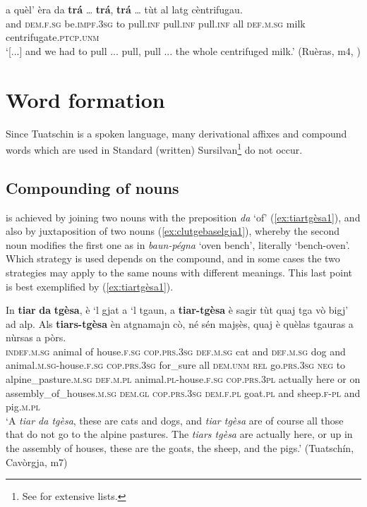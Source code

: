 \ea
\label{ex:rep2}
\gll [...] a quèl’ èra da \textbf{trá} … \textbf{trá}, \textbf{trá} … tùt al latg cèntrifugau.\\
{} and \textsc{dem.f.sg} be.\textsc{impf.3sg} to pull.\textsc{inf} {} pull.\textsc{inf} pull.\textsc{inf} {} all \textsc{def.m.sg} milk centrifugate.\textsc{ptcp.unm}    \\
\glt `[...] and we had to pull ... pull, pull ... the whole centrifuged milk.' (Ruèras, m4, )
\z

\section{Word formation}\label{sec:7.2}
Since Tuatschin is a spoken language, many derivational affixes and compound words which are used in Standard (written) Sursilvan\footnote{See \citet[163--194]{Spescha1989} for extensive lists.} do not occur.

\subsection{Compounding of nouns}\label{7.2.1}
 is achieved by joining two nouns with the preposition \textit{da} `of' (\ref{ex:tiartgèsa1}), and also by juxtaposition of two nouns (\ref{ex:clutgebaselgja1}), whereby the second noun modifies the first one as in \textit{baun-pégna} `oven bench', literally `bench-oven'. Which strategy is used depends on the compound, and in some cases the two strategies may apply to the same nouns with different meanings. This last point is best exemplified by (\ref{ex:tiartgèsa1}).

\ea\label{ex:tiartgèsa1}
\gll  In \textbf{tiar} \textbf{da} \textbf{tgèsa}, è `l gjat a `l tgaun, a \textbf{tiar-tgèsa} è sagir tùt quaj tga vò bigj’ ad alp. Als \textbf{tiars-tgèsa} èn atgnamajn cò, né sén majṣès, quaj è quèlas tgauras a nùrsas a pòrs.  \\
\textsc{indef.m.sg} animal of house.\textsc{f.sg} \textsc{cop.prs.3sg} \textsc{def.m.sg} cat and \textsc{def.m.sg} dog  and animal.\textsc{m.sg}-house.\textsc{f.sg} \textsc{cop.prs.3sg} for\_sure all \textsc{dem.unm} \textsc{rel} go.\textsc{prs.3sg} \textsc{neg} to alpine\_pasture.\textsc{m.sg} \textsc{def.m.pl} animal.\textsc{pl}-house.\textsc{f.sg} \textsc{cop.prs.3pl} actually here or on assembly\_of\_houses.\textsc{m.sg} \textsc{dem.gl} \textsc{cop.prs.3sg} \textsc{dem.f.pl} goat.\textsc{pl} and sheep.\textsc{f-pl} and pig.\textsc{m.pl}\\
\glt `A \textit{tiar da tgèsa}, these are cats and dogs, and \textit{tiar tgèsa} are of course all those that do not go to the alpine pastures. The \textit{tiars tgèsa} are actually here, or up in the assembly of houses, these are the goats, the sheep, and the pigs.' (Tuatschín, Cavòrgja, m7)
\z

